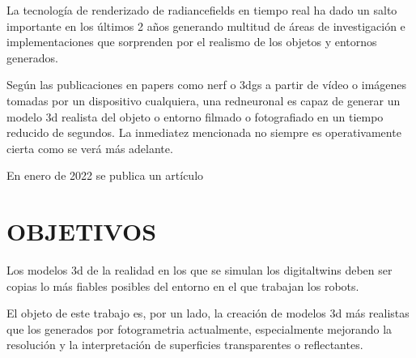\documentclass[a4paper, 12pt, spanish, twoside]{article}
\begin{document}
La tecnología de \gls{renderizado} de \glspl{radiancefield} en tiempo real ha dado un salto importante en los últimos 2 años generando multitud de áreas de investigación e implementaciones que sorprenden por el realismo de los objetos y entornos generados.

Según las publicaciones en papers como \acrfull{nerf} o \acrfull{3dgs} a partir de vídeo o imágenes tomadas por un dispositivo cualquiera, una \gls{redneuronal} es capaz de generar un modelo \acrshort{3d} realista del objeto o entorno filmado o fotografiado en un tiempo reducido de segundos. La inmediatez mencionada no siempre es operativamente cierta como se verá más adelante.



En enero de 2022 se publica un artículo







\clearpage





\newpage
\section{OBJETIVOS} \label{sec:objetivos}

Los modelos \acrshort{3d} de la realidad en los que se simulan los \glspl{digitaltwin} deben ser copias lo más fiables posibles del entorno en el que trabajan los robots. 

El objeto de este trabajo es, por un lado, la creación de modelos \acrshort{3d} más realistas que los generados por \gls{fotogrametria} actualmente, especialmente mejorando la resolución y la interpretación de superficies transparentes o reflectantes. 
\end{document}
